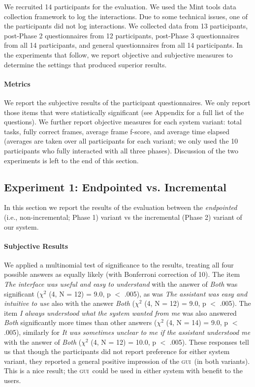 \documentclass[11pt]{article}
\newcommand{\ui}[0]{\textsc{gui}}
\begin{document}
We recruited 14 participants for the evaluation. We used the Mint tools data collection framework \cite{kousidis2012evaluating} to log the interactions. Due to some technical issues, one of the participants did not log interactions. We collected data from 13 participants, post-Phase 2 questionnaires from 12 participants,  post-Phase 3 questionnaires from all 14 participants, and general questionnaires from all 14 participants. In the experiments that follow, we report objective and subjective measures to determine the settings that produced superior results.

\paragraph{Metrics} We report the subjective results of the participant questionnaires. We only report those items that were statistically significant (see Appendix for a full list of the questions). We further report objective measures for each system variant: total tasks, fully correct frames, average frame f-score, and average time elapsed (averages are taken over all participants for each variant; we only used the 10 participants who fully interacted with all three phases). Discussion of the two experiments is left to the end of this section.

\subsection{Experiment 1: Endpointed vs. Incremental}
\label{section:exp1}

In this section we report the results of the evaluation between the \emph{endpointed} (i.e., non-incremental; Phase 1) variant vs the incremental (Phase 2) variant of our system.

\paragraph{Subjective Results} We applied a multinomial test of significance to the results, treating all four possible answers as equally likely (with Bonferroni correction of 10). The item \emph{The interface was useful and easy to understand} with the answer of \emph{Both} was significant ($ \chi^2 $ (4, N = 12) = 9.0, p $<$ .005), as was \emph{The assistant was easy and intuitive to use} also with the answer \emph{Both} ($ \chi^2 $ (4, N = 12) = 9.0, p $<$ .005). The item \emph{I always understood what the system wanted from me} was also answered \emph{Both} significantly more times than other answers ($ \chi^2 $ (4, N = 14) = 9.0, p $<$ .005), similarly for \emph{It was sometimes unclear to me if the assistant understood me} with the answer of \emph{Both} ($ \chi^2 $ (4, N = 12) = 10.0, p $<$ .005).  These responses tell us that though the participants did not report preference for either system variant, they reported a general positive impression of the \ui\ (in both variants). This is a nice result; the \ui\ could be used in either system with benefit to the users.
\end{document}
